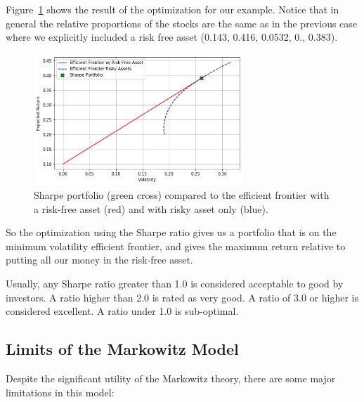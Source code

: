 Figure~\ref{fig:sharpe_ratio} shows the result of the optimization for our example.    
Notice that in general the relative proportions of the stocks are the
same as in the previous case where we explicitly included a risk free
asset (0.143, 0.416, 0.0532, 0., 0.383).

\begin{figure}[htb]
	\centering
	\includegraphics[width=0.7\textwidth]{figures/sharpe_ratio.png}
	\caption{Sharpe portfolio (green cross) compared to the efficient frontier with a risk-free asset (red) and with risky asset only (blue).}
	\label{fig:sharpe_ratio}
\end{figure}

So the optimization using the Sharpe ratio gives us a portfolio that is
on the minimum volatility efficient frontier, and gives the maximum
return relative to putting all our money in the risk-free asset.

Usually, any Sharpe ratio greater than 1.0 is considered acceptable to good by investors. A ratio higher than 2.0 is rated as very good. A ratio of 3.0 or higher is considered excellent. A ratio under 1.0 is sub-optimal.

\subsection{Limits of the Markowitz
Model}\label{limits-of-the-markowitz-model}

Despite the significant utility of the Markowitz theory, there are some
major limitations in this model:


